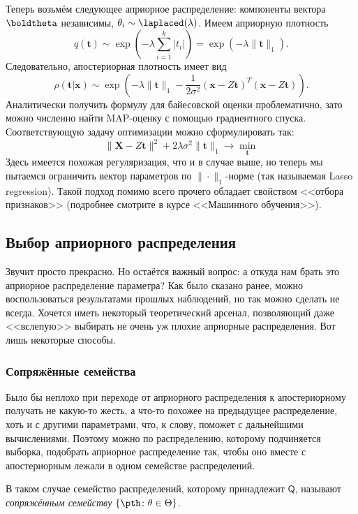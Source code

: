 \begin{example}
Теперь возьмём следующее априорное распределение: компоненты вектора $\boldtheta$ независимы, $\theta_i \sim \laplaced(\lambda)$. Имеем априорную плотность
\[
q(\mathbf t) \sim \exp\left(-\lambda\sum_{i=1}^k |t_i|\right) = \exp\left(-\lambda \|\mathbf t\|_1\right).
\]
Следовательно, апостериорная плотность имеет вид
\[
\rho(\mathbf t|\mathbf{x}) \sim 
\exp\left(-\lambda \|\mathbf t\|_1 - \frac{1}{2\sigma^2} (\mathbf{x} - Z\mathbf t)^T (\mathbf{x} - Z\mathbf t)\right).
\]
Аналитически получить формулу для байесовской оценки проблематично, зато можно численно найти MAP-оценку с помощью градиентного спуска. Соответствующую задачу оптимизации можно сформулировать так:
\[
\|\mathbf X - Z \mathbf t\|^2 + 2\lambda\sigma^2 \| \mathbf t\|_1 \to \min_{\mathbf t}
\]
Здесь имеется похожая регуляризация, что и в случае выше, но теперь мы пытаемся ограничить вектор параметров по $\|\cdot\|_1$-норме (так называемая \textsf{Lasso regression}). Такой подход помимо всего прочего обладает свойством <<отбора признаков>> (подробнее смотрите в курсе <<Машинного обучения>>).
\end{example}

\subsection{Выбор априорного распределения}

Звучит просто прекрасно. Но остаётся важный вопрос: а откуда нам брать это априорное распределение параметра? Как было сказано ранее, можно воспользоваться результатами прошлых наблюдений, но так можно сделать не всегда. Хочется иметь некоторый теоретический арсенал, позволяющий даже <<вслепую>> выбирать не очень уж плохие априорные распределения. Вот лишь некоторые способы.

\subsubsection{Сопряжённые семейства}

Было бы неплохо при переходе от априорного распределения к апостериорному получать не какую-то жесть, а что-то похожее на предыдущее распределение, хоть и с другими параметрами, что, к слову, поможет с дальнейшими вычислениями. Поэтому можно по распределению, которому подчиняется выборка, подобрать априорное распределение так, чтобы оно вместе с апостериорным лежали в одном семействе распределений.
\begin{definition}
    В таком случае семейство распределений, которому принадлежит $\mathsf{Q}$, называют \textit{сопряжённым семейству} $\{\pth\colon \theta \in \Theta\}$.
\end{definition}

